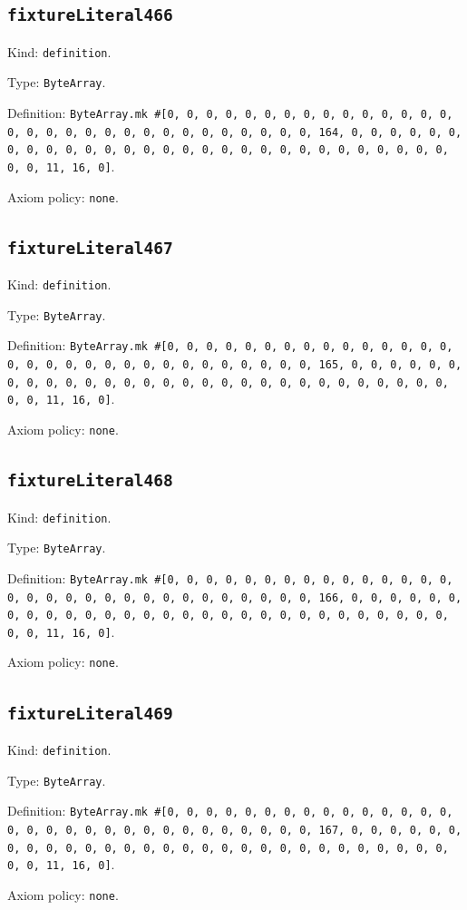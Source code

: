 \documentclass[11pt]{article}
\begin{document}
\subsection*{\texttt{fixtureLiteral466}}
\noindent Kind: \texttt{definition}.\par
\noindent Type: \texttt{ByteArray}.\par
\noindent Definition: \texttt{ByteArray.mk \#[0, 0, 0, 0, 0, 0, 0, 0, 0, 0, 0, 0, 0, 0, 0, 0, 0, 0, 0, 0, 0, 0, 0, 0, 0, 0, 0, 0, 0, 0, 0, 164, 0, 0, 0, 0, 0, 0, 0, 0, 0, 0, 0, 0, 0, 0, 0, 0, 0, 0, 0, 0, 0, 0, 0, 0, 0, 0, 0, 0, 0, 0, 0, 11, 16, 0]}.\par
\noindent Axiom policy: \texttt{none}.\par
\subsection*{\texttt{fixtureLiteral467}}
\noindent Kind: \texttt{definition}.\par
\noindent Type: \texttt{ByteArray}.\par
\noindent Definition: \texttt{ByteArray.mk \#[0, 0, 0, 0, 0, 0, 0, 0, 0, 0, 0, 0, 0, 0, 0, 0, 0, 0, 0, 0, 0, 0, 0, 0, 0, 0, 0, 0, 0, 0, 0, 165, 0, 0, 0, 0, 0, 0, 0, 0, 0, 0, 0, 0, 0, 0, 0, 0, 0, 0, 0, 0, 0, 0, 0, 0, 0, 0, 0, 0, 0, 0, 0, 11, 16, 0]}.\par
\noindent Axiom policy: \texttt{none}.\par
\subsection*{\texttt{fixtureLiteral468}}
\noindent Kind: \texttt{definition}.\par
\noindent Type: \texttt{ByteArray}.\par
\noindent Definition: \texttt{ByteArray.mk \#[0, 0, 0, 0, 0, 0, 0, 0, 0, 0, 0, 0, 0, 0, 0, 0, 0, 0, 0, 0, 0, 0, 0, 0, 0, 0, 0, 0, 0, 0, 0, 166, 0, 0, 0, 0, 0, 0, 0, 0, 0, 0, 0, 0, 0, 0, 0, 0, 0, 0, 0, 0, 0, 0, 0, 0, 0, 0, 0, 0, 0, 0, 0, 11, 16, 0]}.\par
\noindent Axiom policy: \texttt{none}.\par
\subsection*{\texttt{fixtureLiteral469}}
\noindent Kind: \texttt{definition}.\par
\noindent Type: \texttt{ByteArray}.\par
\noindent Definition: \texttt{ByteArray.mk \#[0, 0, 0, 0, 0, 0, 0, 0, 0, 0, 0, 0, 0, 0, 0, 0, 0, 0, 0, 0, 0, 0, 0, 0, 0, 0, 0, 0, 0, 0, 0, 167, 0, 0, 0, 0, 0, 0, 0, 0, 0, 0, 0, 0, 0, 0, 0, 0, 0, 0, 0, 0, 0, 0, 0, 0, 0, 0, 0, 0, 0, 0, 0, 11, 16, 0]}.\par
\noindent Axiom policy: \texttt{none}.\par
\end{document}
